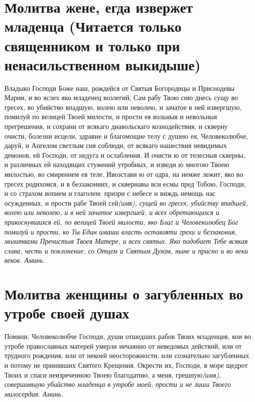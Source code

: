 


\section{Молитва жене, егда извержет младенца (Читается только священником и только при ненасильственном выкидыше)}\begin{mymulticols}



Владыко Господи Боже наш, рождейся от Святыя Богородицы и Приснодевы Марии, и во яслех яко младенец возлегий, Сам рабу Твою сию днесь сущу во гресех, во убийство впадшую, волею или неволею, и зачатое в ней извергшую, помилуй по велицей Твоей милости, и прости ея вольныя и невольныя прегрешения, и сохрани от всякаго диавольскаго кознодействия, и скверну очисти, болезни исцели, здравие и благомощие телу с душею ея, Человеколюбче, даруй, и Ангелом светлым сия соблюди, от всякаго нашествия невидимых демонов, ей Господи, от недуга и ослабления. И очисти ю от телесныя скверны, и различных ей находящих стужений утробных, и изведи ю многою Твоею милостью, во смиреннем ея теле. Ивозстави ю от одра, на немже лежит, яко во гресех родихомся, и в беззакониих, и сквернавы вси есмы пред Тобою, Господи, и со страхом вопием и глаголем: призри с небесе и виждь немощь нас осужденных, и прости рабе Твоей сей\itshape  (имя\normalfont{})\itshape ,\normalfont{} сущей во гресех, убийству впадшей, волею или неволею, и в ней зачатое извергшей, и всех обретающихся и прикоснувшихся ей, по велицей Твоей милости, яко Благ и Человеколюбец Бог помилуй и прости, ко Ты Един имаши власть оставляти грехи и беззакония, молитвами Пречистыя Твоея Матере, и всех святых. Яко подобает Тебе всякая слава, честь и поклонение, со Отцем и Святым Духом, ныне и присно и во веки веков. Аминь.


\end{mymulticols}

\section{Молитва женщины о загубленных во утробе своей душах}\begin{mymulticols}



Помяни, Человеколюбче Господи, души отшедших рабов Твоих младенцев, кои во утробе православных матерей умерли нечаянно от неведомых действий, или от трудного рождения, или от некоей неосторожности, или сознательно загубленных и потому не принявших Святого Крещения. Окрести их, Господи, в море щедрот Твоих и спаси неизреченною Твоею благодатию, а меня, грешную\itshape  (имя\normalfont{}), совершившую убийство младенца в утробе моей, прости и не лиши Твоего милосердия. Аминь.


\end{mymulticols}

